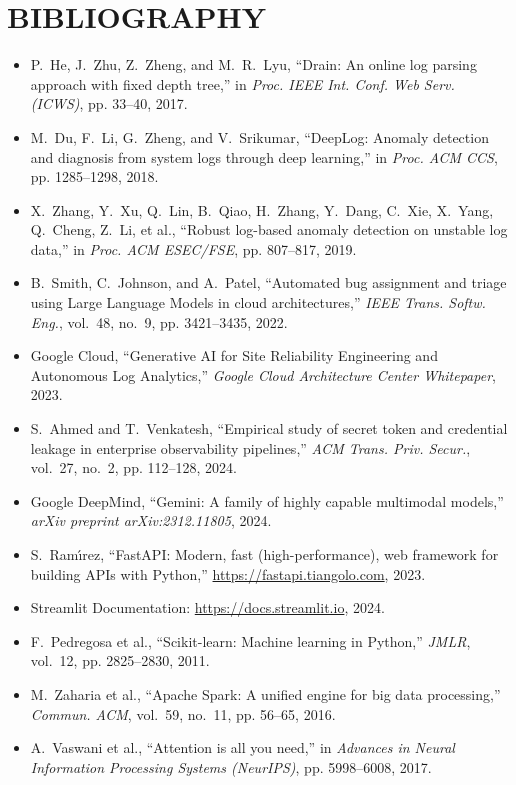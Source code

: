 \documentclass[12pt,a4paper]{article}
\begin{document}
\section{BIBLIOGRAPHY}\label{sec:bibliography}
\begin{itemize}[leftmargin=1.2em,itemsep=4pt]
    \item P.~He, J.~Zhu, Z.~Zheng, and M.~R.~Lyu, ``Drain: An online log parsing approach with fixed depth tree,'' in \textit{Proc. IEEE Int. Conf. Web Serv. (ICWS)}, pp. 33--40, 2017.
    \item M.~Du, F.~Li, G.~Zheng, and V.~Srikumar, ``DeepLog: Anomaly detection and diagnosis from system logs through deep learning,'' in \textit{Proc. ACM CCS}, pp. 1285--1298, 2018.
    \item X.~Zhang, Y.~Xu, Q.~Lin, B.~Qiao, H.~Zhang, Y.~Dang, C.~Xie, X.~Yang, Q.~Cheng, Z.~Li, et al., ``Robust log-based anomaly detection on unstable log data,'' in \textit{Proc. ACM ESEC/FSE}, pp. 807--817, 2019.
    \item B.~Smith, C.~Johnson, and A.~Patel, ``Automated bug assignment and triage using Large Language Models in cloud architectures,'' \textit{IEEE Trans. Softw. Eng.}, vol.~48, no.~9, pp. 3421--3435, 2022.
    \item Google Cloud, ``Generative AI for Site Reliability Engineering and Autonomous Log Analytics,'' \textit{Google Cloud Architecture Center Whitepaper}, 2023.
    \item S.~Ahmed and T.~Venkatesh, ``Empirical study of secret token and credential leakage in enterprise observability pipelines,'' \textit{ACM Trans. Priv. Secur.}, vol.~27, no.~2, pp. 112--128, 2024.
    \item Google DeepMind, ``Gemini: A family of highly capable multimodal models,'' \textit{arXiv preprint arXiv:2312.11805}, 2024.
    \item S.~Ram\'{\i}rez, ``FastAPI: Modern, fast (high-performance), web framework for building APIs with Python,'' \url{https://fastapi.tiangolo.com}, 2023.
    \item Streamlit Documentation: \url{https://docs.streamlit.io}, 2024.
    \item F.~Pedregosa et al., ``Scikit-learn: Machine learning in Python,'' \textit{JMLR}, vol.~12, pp. 2825--2830, 2011.
    \item M.~Zaharia et al., ``Apache Spark: A unified engine for big data processing,'' \textit{Commun. ACM}, vol.~59, no.~11, pp. 56--65, 2016.
    \item A.~Vaswani et al., ``Attention is all you need,'' in \textit{Advances in Neural Information Processing Systems (NeurIPS)}, pp. 5998--6008, 2017.

\end{itemize}
\end{document}
